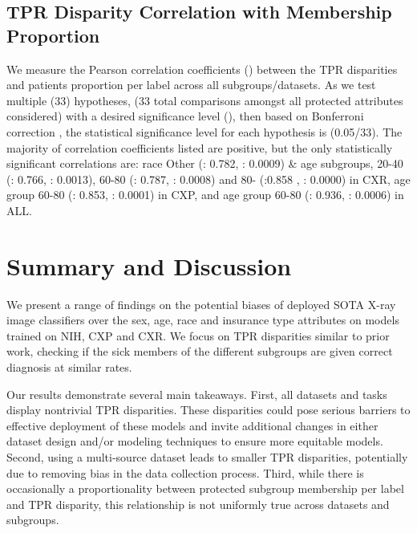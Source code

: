\documentclass{ws-procs11x85}
\begin{document}
\subsection{TPR Disparity Correlation with Membership Proportion}
\label{sec:proportion}
We measure the Pearson correlation coefficients () between the TPR disparities and patients proportion per label across all subgroups/datasets. As we test multiple (33) hypotheses, (33 total comparisons amongst all protected attributes considered) with a desired significance level (), then based on Bonferroni correction \cite{Bonferroni}, the statistical significance level for each hypothesis is  (0.05/33). The majority of correlation coefficients listed are positive, but the only statistically significant correlations are: race Other (: 0.782, : 0.0009) \& age subgroups, 20-40 (: 0.766, : 0.0013), 60-80 (: 0.787, : 0.0008) and 80- (:0.858 , : 0.0000) in CXR, age group 60-80 (: 0.853, : 0.0001) in CXP, and age group 60-80 (: 0.936, : 0.0006) in ALL.
































\section{Summary and Discussion}
\label{sec:Discussion}

We present a range of findings on the potential biases of deployed SOTA X-ray image classifiers over the sex, age, race and insurance type attributes on models trained on NIH, CXP and CXR. We focus on TPR disparities similar to prior work,\cite{de2019bias} checking if the sick members of the different subgroups are given correct diagnosis at similar rates. 

Our results demonstrate several main takeaways. First, all datasets and tasks display nontrivial TPR disparities. These disparities could pose serious barriers to effective deployment of these models and invite additional changes in either dataset design and/or modeling techniques to ensure more equitable models. Second, using a multi-source dataset leads to smaller TPR disparities, potentially due to removing bias in the data collection process. Third, while there is occasionally a proportionality between protected subgroup membership per label and TPR disparity, this relationship is not uniformly true across datasets and subgroups. 
\end{document}
